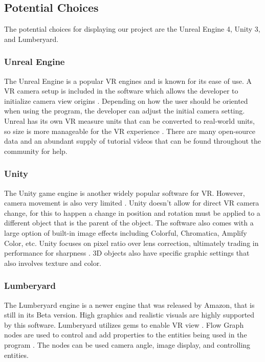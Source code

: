 \documentclass[onecolumn, draftclsnofoot,10pt, compsoc]{IEEEtran}
\begin{document}
\subsection{Potential Choices}
\begin{singlespace}
The potential choices for displaying our project are the Unreal Engine 4, Unity 3, and Lumberyard.   
\end{singlespace}

\subsubsection{Unreal Engine}
\begin{singlespace}
The Unreal Engine is a popular VR engines and is known for its ease of use. A VR camera setup is included in the software which allows the developer to initialize camera view origins \cite{UE4 EG}. Depending on how the user should be oriented when using the program, the developer can adjust the initial camera setting. Unreal has its own VR measure units that can be converted to real-world units, so size is more manageable for the VR experience \cite{UE4 EG}. There are many open-source data and an abundant supply of tutorial videos that can be found throughout the community for help.   

\end{singlespace}

\subsubsection{Unity}
\begin{singlespace}
The Unity game engine is another widely popular software for VR. However, camera movement is also very limited \cite{unity doc}. Unity doesn’t allow for direct VR camera change, for this to happen a change in position and rotation must be applied to a different object that is the parent of the object. The software also comes with a large option of built-in image effects including Colorful, Chromatica, Amplify Color, etc. Unity focuses on pixel ratio over lens correction, ultimately trading in performance for sharpness \cite{unity3d}. 3D objects also have specific graphic settings that also involves texture and color. 
 
\end{singlespace}

\subsubsection{Lumberyard}
\begin{singlespace}
The Lumberyard engine is a newer engine that was released by Amazon, that is still in its Beta version. High graphics and realistic visuals are highly supported by this software. Lumberyard utilizes gems to enable VR view \cite{lumberyard}. Flow Graph nodes are used to control and add properties to the entities being used in the program \cite{lumberyard doc}. The nodes can be used camera angle, image display, and controlling entities.    
\end{singlespace}
\end{document}
